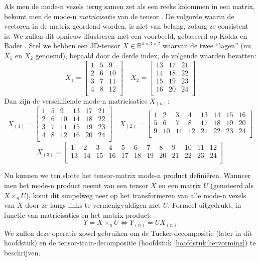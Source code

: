 Als men de mode-n vezels terug samen zet als een reeks kolommen in een matrix, bekomt men de mode-n \textit{matricisatie} van de tensor \cite{ref:kolda}. De volgorde waarin de vectoren in de matrix geordend worden, is niet van belang, zolang ze consistent is. We zullen dit opnieuw illustreren met een voorbeeld, gebaseerd op Kolda en Bader \cite{ref:kolda}. Stel we hebben een 3D-tensor $X \in \mathbb{R}^{4 \times 3 \times 2}$ waarvan de twee ``lagen'' (nu $X_1$ en $X_2$ genoemd), bepaald door de derde index, de volgende waarden bevatten:
\[
X_1 = \begin{bmatrix}
1 & 5 & 9 \\
2 & 6 & 10 \\
3 & 7 & 11 \\
4 & 8 & 12 \\
\end{bmatrix}
\quad
X_2 = \begin{bmatrix}
13 & 17 & 21 \\
14 & 18 & 22 \\
15 & 19 & 23 \\
16 & 20 & 24 \\
\end{bmatrix}
\]
\newpage
Dan zijn de verschillende mode-n matricisaties $X_{(n)}$:
\[
X_{(1)} = \begin{bmatrix}
1 & 5 & 9  & 13 & 17 & 21 \\
2 & 6 & 10 & 14 & 18 & 22 \\
3 & 7 & 11 & 15 & 19 & 23 \\
4 & 8 & 12 & 16 & 20 & 24 \\
\end{bmatrix}
\quad
X_{(2)} = \begin{bmatrix}
1 & 2  & 3  & 4  & 13 & 14 & 15 & 16 \\
5 & 6  & 7  & 8  & 17 & 18 & 19 & 20 \\
9 & 10 & 11 & 12 & 21 & 22 & 23 & 24 \\
\end{bmatrix}
\]
\[
X_{(3)} = \begin{bmatrix}
1  & 2  & 3  & 4  & 5  & 6  & 7  & 8  & 9  & 10 & 11 & 12 \\
13 & 14 & 15 & 16 & 17 & 18 & 19 & 20 & 21 & 22 & 23 & 24 \\
\end{bmatrix}
\]

Nu kunnen we ten slotte het tensor-matrix mode-n product defini\"eren. Wanneer men het mode-n product neemt van een tensor $X$ en een matrix $U$ (genoteerd als $X \times_n U$), komt dit simpelweg neer op het transformeren van alle mode-n vezels van $X$ door ze langs links te vermenigvuldigen met $U$. Formeel uitgedrukt, in functie van matricisaties en het matrix-product:
\[
Y = X \times_n U \Leftrightarrow Y_{(n)} = U X_{(n)}
\]
We zullen deze operatie zowel gebruiken om de Tucker-decompositie (later in dit hoofdstuk) en de tensor-train-decompositie (hoofdstuk \ref{hoofdstuk:hervorming}) te beschrijven.

